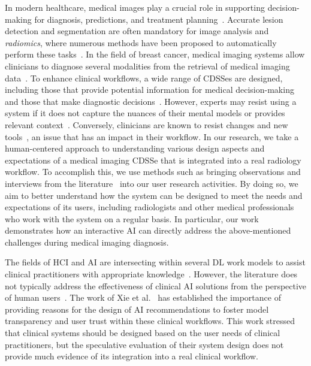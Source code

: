 In modern healthcare, medical images play a crucial role in supporting decision-making for diagnosis, predictions, and treatment planning~\cite{liang2019deep, graffy2019automated, https://doi.org/10.13140/rg.2.2.25718.65606}.
Accurate lesion detection and segmentation are often mandatory for image analysis and {\it radiomics}, where numerous methods have been proposed to automatically perform these tasks~\cite{litjens2017survey}.
In the field of breast cancer, medical imaging systems allow clinicians to diagnose several modalities from the retrieval of medical imaging data~\cite{faraji2019radiologic, seifabadi2019correlation}.
To enhance clinical workflows, a wide range of \acp{CDSSe} are designed, including those that provide potential information for medical decision-making and those that make diagnostic decisions~\cite{10.1145/3290605.3300234, edge2019clinical, GU2020101858, hwang2019artificial, NASSIF2022102276}.
However, experts may resist using a system if it does not capture the nuances of their mental models or provides relevant context~\cite{khairat2018reasons, kohli2018cad, yang2016investigating}.
Conversely, clinicians are known to resist changes and new tools~\cite{10.1145/3132272.3134111, gagnon2014electronic}, an issue that has an impact in their workflow.
In our research, we take a human-centered approach to understanding various design aspects and expectations of a medical imaging \ac{CDSSe} that is integrated into a real radiology workflow.
To accomplish this, we use methods such as bringing observations and interviews from the literature~\cite{Sarcevic:2012:TET:2240156.2240161, Lim:2019:DDI:3319806.3301427} into our user research activities.
By doing so, we aim to better understand how the system can be designed to meet the needs and expectations of its users, including radiologists and other medical professionals who work with the system on a regular basis.
In particular, our work demonstrates how an interactive \ac{AI} can directly address the above-mentioned challenges during medical imaging diagnosis.

The fields of \ac{HCI} and \ac{AI} are intersecting within several \ac{DL} work models to assist clinical practitioners with appropriate knowledge~\cite{DeeplearningtodiagnosepouchofDouglasobliterationwithultrasoundslidingsign, 9540298, 9730804}.
However, the literature does not typically address the effectiveness of clinical \ac{AI} solutions from the perspective of human users~\cite{10.1145/3359206, info:doi/10.2196/28659}.
The work of Xie et al.~\cite{10.1145/3313831.3376807} has established the importance of providing reasons for the design of \ac{AI} recommendations to foster model transparency and user trust within these clinical workflows.
This work stressed that clinical systems should be designed based on the user needs of clinical practitioners, but the speculative evaluation of their system design does not provide much evidence of its integration into a real clinical workflow.

